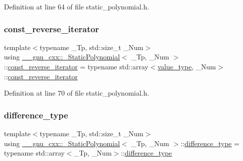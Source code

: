 Definition at line 64 of file static\+\_\+polynomial.\+h.

\mbox{\label{class____gnu__cxx_1_1__StaticPolynomial_a03b96649dc974fc6829342659325b7cb}} 
\subsubsection{\texorpdfstring{const\+\_\+reverse\+\_\+iterator}{const\_reverse\_iterator}}
{\footnotesize\ttfamily template$<$typename \+\_\+\+Tp, std\+::size\+\_\+t \+\_\+\+Num$>$ \\
using \hyperlink{class____gnu__cxx_1_1__StaticPolynomial}{\+\_\+\+\_\+gnu\+\_\+cxx\+::\+\_\+\+Static\+Polynomial}$<$ \+\_\+\+Tp, \+\_\+\+Num $>$\+::\hyperlink{class____gnu__cxx_1_1__StaticPolynomial_a03b96649dc974fc6829342659325b7cb}{const\+\_\+reverse\+\_\+iterator} =  typename std\+::array$<$\hyperlink{class____gnu__cxx_1_1__StaticPolynomial_af23110f5a002cd6caa3542df7cf35284}{value\+\_\+type}, \+\_\+\+Num$>$\+::\hyperlink{class____gnu__cxx_1_1__StaticPolynomial_a03b96649dc974fc6829342659325b7cb}{const\+\_\+reverse\+\_\+iterator}}



Definition at line 70 of file static\+\_\+polynomial.\+h.

\mbox{\label{class____gnu__cxx_1_1__StaticPolynomial_a4bce7e45f80b4b78465834f02236c5cc}} 
\subsubsection{\texorpdfstring{difference\+\_\+type}{difference\_type}}
{\footnotesize\ttfamily template$<$typename \+\_\+\+Tp, std\+::size\+\_\+t \+\_\+\+Num$>$ \\
using \hyperlink{class____gnu__cxx_1_1__StaticPolynomial}{\+\_\+\+\_\+gnu\+\_\+cxx\+::\+\_\+\+Static\+Polynomial}$<$ \+\_\+\+Tp, \+\_\+\+Num $>$\+::\hyperlink{class____gnu__cxx_1_1__StaticPolynomial_a4bce7e45f80b4b78465834f02236c5cc}{difference\+\_\+type} =  typename std\+::array$<$\+\_\+\+Tp, \+\_\+\+Num$>$\+::\hyperlink{class____gnu__cxx_1_1__StaticPolynomial_a4bce7e45f80b4b78465834f02236c5cc}{difference\+\_\+type}}



